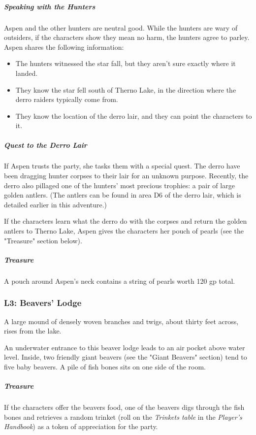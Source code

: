 \documentclass[10pt,a4paper,twoside,bg=print,twocolumn,openany,nodeprecatedcode]{dndbook}
\begin{document}
\subparagraph{Speaking with the Hunters}
Aspen and the other hunters are neutral good. While the hunters are wary of outsiders, if the characters show they mean no harm, the hunters agree to parley. Aspen shares the following information:


\begin{itemize}
\item The hunters witnessed the star fall, but they aren't sure exactly where it landed.
\item They know the star fell south of Therno Lake, in the direction where the derro raiders typically come from.
\item They know the location of the derro lair, and they can point the characters to it.
\end{itemize}

\subparagraph{Quest to the Derro Lair}
If Aspen trusts the party, she tasks them with a special quest. The derro have been dragging hunter corpses to their lair for an unknown purpose. Recently, the derro also pillaged one of the hunters' most precious trophies: a pair of large golden antlers. (The antlers can be found in area D6 of the derro lair, which is detailed earlier in this adventure.)

If the characters learn what the derro do with the corpses and return the golden antlers to Therno Lake, Aspen gives the characters her pouch of pearls (see the "Treasure" section below).

\subparagraph{Treasure}
A pouch around Aspen's neck contains a string of pearls worth 120 gp total.

\subsubsection{L3: Beavers' Lodge}
\begin{DndReadAloud}{}
A large mound of densely woven branches and twigs, about thirty feet across, rises from the lake.

\end{DndReadAloud}

An underwater entrance to this beaver lodge leads to an air pocket above water level. Inside, two friendly giant beavers (see the "Giant Beavers" section) tend to five baby beavers. A pile of fish bones sits on one side of the room.

\subparagraph{Treasure}
If the characters offer the beavers food, one of the beavers digs through the fish bones and retrieves a random trinket (roll on the \textit{Trinkets table} in the \textit{Player's Handbook}) as a token of appreciation for the party.
\end{document}
